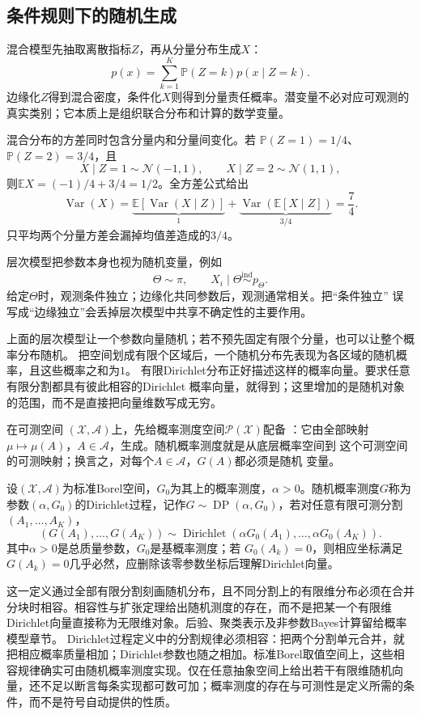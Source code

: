 \subsection{条件规则下的随机生成}
\label{sec:rv-random-generation}
混合模型先抽取离散指标\(Z\)，再从分量分布生成\(X\)：
\[ p(x)=\sum_{k=1}^{K}\mathbb{P}(Z=k)p(x\mid Z=k). \]
边缘化\(Z\)得到混合密度，条件化\(X\)则得到分量责任概率。潜变量不必对应可观测的真实类别；它本质上是组织联合分布和计算的数学变量。

混合分布的方差同时包含分量内和分量间变化。若
\(\mathbb{P}(Z=1)=1/4\)、\(\mathbb{P}(Z=2)=3/4\)，且
\[
  X\mid Z=1\sim\mathcal{N}(-1,1),\qquad
  X\mid Z=2\sim\mathcal{N}(1,1),
\]
则\(\mathbb{E}X=(-1)/4+3/4=1/2\)。全方差公式给出
\[
  \operatorname{Var}(X)
  =\underbrace{\mathbb{E}[\operatorname{Var}(X\mid Z)]}_{1}
   +\underbrace{\operatorname{Var}(\mathbb{E}[X\mid Z])}_{3/4}
  =\frac74.
\]
只平均两个分量方差会漏掉均值差造成的\(3/4\)。

层次模型把参数本身也视为随机变量，例如
\[ \Theta\sim\pi,\qquad
  X_i\mid\Theta\mathrel{\overset{\mathrm{ind}}{\sim}}p_\Theta. \]
给定\(\Theta\)时，观测条件独立；边缘化共同参数后，观测通常相关。把“条件独立”
误写成“边缘独立”会丢掉层次模型中共享不确定性的主要作用。

上面的层次模型让一个参数向量随机；若不预先固定有限个分量，也可以让整个概率分布随机。
把空间划成有限个区域后，一个随机分布先表现为各区域的随机概率，且这些概率之和为$1$。
有限Dirichlet分布正好描述这样的概率向量。要求任意有限分割都具有彼此相容的Dirichlet
概率向量，就得到；这里增加的是随机对象的范围，而不是直接把向量维数写成无穷。
\begin{definition}[随机概率测度]
  \label{def:probability-random-probability-measure}
在可测空间
\((\mathcal X,\mathcal A)\)上，先给概率测度空间\(\mathcal P(\mathcal X)\)配备
：它由全部映射
\(\mu\mapsto\mu(A)\)，\(A\in\mathcal A\)，生成。随机概率测度就是从底层概率空间到
这个可测空间的可测映射；换言之，对每个\(A\in\mathcal A\)，\(G(A)\)都必须是随机
变量。
\end{definition}
\begin{definition}[Dirichlet过程]
  \label{def:probability-dirichlet-process}
  设\((\mathcal X,\mathcal A)\)为标准Borel空间，\(G_0\)为其上的概率测度，\(\alpha>0\)。随机概率测度\(G\)称为参数\((\alpha,G_0)\)的Dirichlet过程，记作\(G\sim\operatorname{DP}(\alpha,G_0)\)，若对任意有限可测分割
\((A_1,\ldots,A_K)\)，
\[ (G(A_1),\ldots,G(A_K))
  \sim\operatorname{Dirichlet}(\alpha G_0(A_1),\ldots,\alpha G_0(A_K)). \]
其中\(\alpha>0\)是总质量参数，\(G_0\)是基概率测度；若
\(G_0(A_k)=0\)，则相应坐标满足\(G(A_k)=0\)几乎必然，应删除该零参数坐标后理解Dirichlet向量。
\end{definition}
这一定义通过全部有限分割刻画随机分布，且不同分割上的有限维分布必须在合并分块时相容。相容性与扩张定理给出随机测度的存在，而不是把某一个有限维Dirichlet向量直接称为无限维对象。后验、聚类表示及非参数Bayes计算留给概率模型章节。
Dirichlet过程定义中的分割规律必须相容：把两个分割单元合并，就把相应概率质量相加；Dirichlet参数也随之相加。标准Borel取值空间上，这些相容规律确实可由随机概率测度实现。仅在任意抽象空间上给出若干有限维随机向量，还不足以断言每条实现都可数可加；概率测度的存在与可测性是定义所需的条件，而不是符号自动提供的性质。

